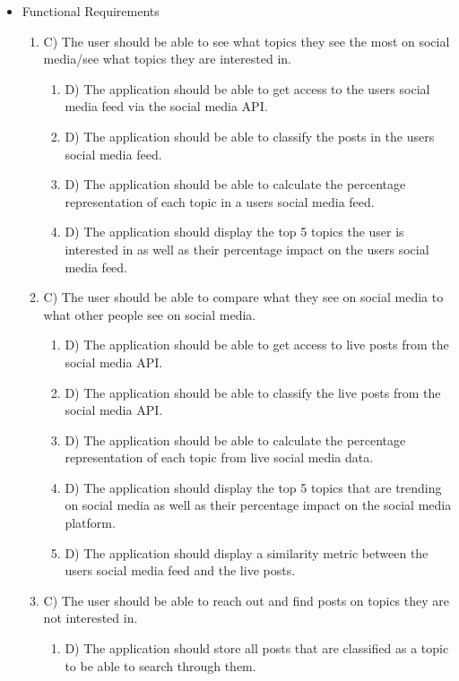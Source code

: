 \begin{itemize}
    \item Functional Requirements
    \begin{enumerate}
        \item C) The user should be able to see what topics they see the most on social media/see what topics they are interested in.
        \begin{enumerate}
            \item D) The application should be able to get access to the users social media feed via the social media API.
            \item D) The application should be able to classify the posts in the users social media feed.
            \item D) The application should be able to calculate the percentage representation of each topic in a users social media feed.
            \item D) The application should display the top 5 topics the user is interested in as well as their percentage impact on the users social media feed.
        \end{enumerate}
        \item C) The user should be able to compare what they see on social media to what other people see on social media.
        \begin{enumerate}
            \item D) The application should be able to get access to live posts from the social media API.
            \item D) The application should be able to classify the live posts from the social media API.
            \item D) The application should be able to calculate the percentage representation of each topic from live social media data.
            \item D) The application should display the top 5 topics that are trending on social media as well as their percentage impact on the social media platform.
            \item D) The application should display a similarity metric between the users social media feed and the live posts.
        \end{enumerate}
        \item C) The user should be able to reach out and find posts on topics they are not interested in.
        \begin{enumerate}
            \item D) The application should store all posts that are classified as a topic to be able to search through them.

\end{enumerate}
\end{enumerate}
\end{itemize}
